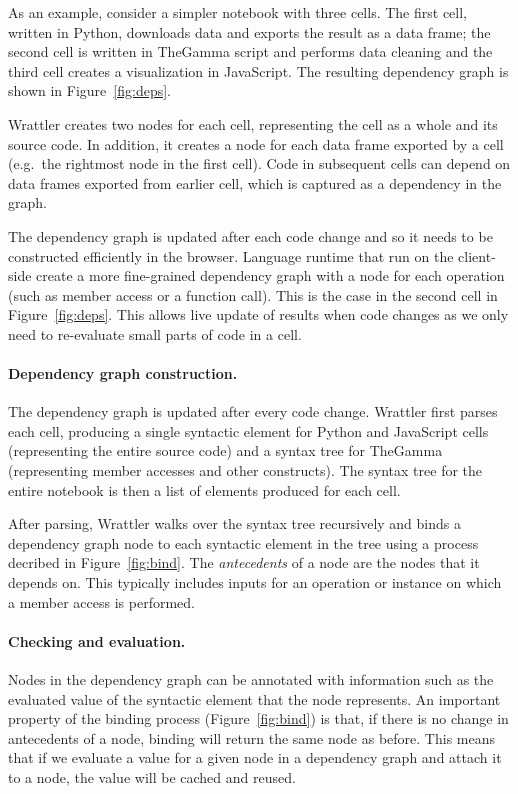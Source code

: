 \documentclass[sigplan]{acmart}\settopmatter{printfolios=true,printccs=false,printacmref=false}
\begin{document}
As an example, consider a simpler notebook with three cells. The first cell, written in Python,
downloads data and exports the result as a data frame; the second cell is written in TheGamma script
and performs data cleaning and the third cell creates a visualization in JavaScript. The
resulting dependency graph is shown in Figure~\ref{fig:deps}.

Wrattler creates two nodes for each cell, representing the cell as a whole and its source
code. In addition, it creates a node for each data frame exported by a cell (e.g.~the rightmost
node in the first cell). Code in subsequent cells can depend on data frames exported from earlier
cell, which is captured as a dependency in the graph. 

The dependency graph is updated after each code change and so it needs to be constructed efficiently 
in the browser. Language runtime that run on the client-side create a more fine-grained 
dependency graph with a node for each operation (such as member access or a function call). This 
is the case in the  second cell in Figure~\ref{fig:deps}. This allows live update of results when 
code changes as we only need to re-evaluate small parts of code in a cell. 

\paragraph{Dependency graph construction.} 
The dependency graph is updated after every code change. Wrattler first parses each 
cell, producing a single syntactic element for Python and JavaScript cells (representing the entire 
source code) and a syntax tree for TheGamma (representing member accesses and other 
constructs). The syntax tree for the entire notebook is then a list of elements produced for each 
cell.
 
After parsing, Wrattler walks over the syntax tree recursively and binds a dependency graph node
to each syntactic element in the tree using a process decribed in Figure~\ref{fig:bind}. 
The \emph{antecedents} of a node are the nodes that it depends on. This typically includes 
inputs for an operation or instance on which a member access is performed. 

\paragraph{Checking and evaluation.} 
Nodes in the dependency graph can be annotated with information such as the evaluated value
of the syntactic element that the node represents. An important property of the binding process
(Figure~\ref{fig:bind}) is that, if there is no change in antecedents of a node, binding will 
return the same node as before. This means that if we evaluate a value for a given node in a 
dependency graph and attach it to a node, the value will be cached and reused. 
\end{document}
